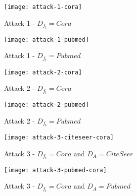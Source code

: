     \begin{figure}[h]
      \begin{center}
        \texttt{[image: attack-1-cora]}
        \caption{Attack 1 - $D_{f_t} = Cora$}
        \label{figure:eval-att1-cora}
      \end{center}
    \end{figure}

    \begin{figure}[h]
      \begin{center}
        \texttt{[image: attack-1-pubmed]}
        \caption{Attack 1 - $D_{f_t} = Pubmed$}
        \label{figure:eval-att1-pubmed}
      \end{center}
    \end{figure}

    \begin{figure}[h]
      \begin{center}
          \texttt{[image: attack-2-cora]}
          \caption{Attack 2 - $D_{f_t} = Cora$}
          \label{figure:eval-att2-cora}
      \end{center}
    \end{figure}

    \begin{figure}[h]
      \begin{center}
          \texttt{[image: attack-2-pubmed]}
          \caption{Attack 2 - $D_{f_t} = Pubmed$}
          \label{figure:eval-att2-pubmed}
      \end{center}
    \end{figure}

    \begin{figure}[h]
      \begin{center}
          \texttt{[image: attack-3-citeseer-cora]}
          \caption{Attack 3 - $D_{f_t} = Cora$ and $D_A = CiteSeer$}
          \label{figure:eval-att3-citeseer-cora}
      \end{center}
  \end{figure}

  \begin{figure}[h]
      \begin{center}
          \texttt{[image: attack-3-pubmed-cora]}
          \caption{Attack 3 - $D_{f_t} = Cora$ and $D_A = Pubmed$}
          \label{figure:eval-att3-pubmed-cora}
      \end{center}
  \end{figure}

